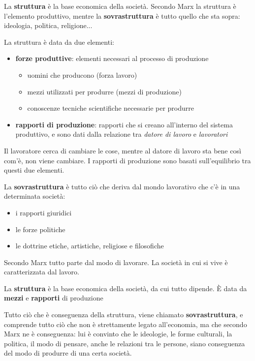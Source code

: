 \documentclass[a4paper, twoside, titlepage]{book}
\begin{document}
La \textbf{struttura} è la base economica della società. Secondo Marx la struttura è l’elemento produttivo, mentre la \textbf{sovrastruttura} è tutto quello che sta sopra: ideologia, politica, religione...

La struttura è data da due elementi:
\begin{itemize}
\item \textbf{forze produttive}: elementi necessari al processo di produzione
\begin{itemize}
  \item uomini che producono (forza lavoro)
  \item mezzi utilizzati per produrre (mezzi di produzione)
  \item conoscenze tecniche scientifiche necessarie per produrre
  \end{itemize}
\item \textbf{rapporti di produzione}: rapporti che si creano all’interno del sistema produttivo, e sono dati dalla relazione tra \textit{datore di lavoro} e \textit{lavoratori}
\end{itemize}

Il lavoratore cerca di cambiare le cose, mentre al datore di lavoro sta bene così com’è, non viene cambiare. I rapporti di produzione sono basati sull’equilibrio tra questi due elementi.

La \textbf{sovrastruttura} è tutto ciò che deriva dal mondo lavorativo che c’è in una determinata società:
\begin{itemize}
\item i rapporti giuridici
\item le forze politiche
\item le dottrine etiche, artistiche, religiose e filosofiche
\end{itemize}

Secondo Marx tutto parte dal modo di lavorare. La società in cui si vive è caratterizzata dal lavoro.

La \textbf{struttura} è la base economica della società, da cui tutto dipende. È data da \textbf{mezzi} e \textbf{rapporti} di produzione

Tutto ciò che è conseguenza della struttura, viene chiamato \textbf{sovrastruttura}, e comprende tutto ciò che non è strettamente legato all’economia, ma che secondo Marx ne è conseguenza: lui è convinto che le ideologie, le forme culturali, la politica, il modo di pensare, anche le relazioni tra le persone, siano conseguenza del modo di produrre di una certa società.
\end{document}
